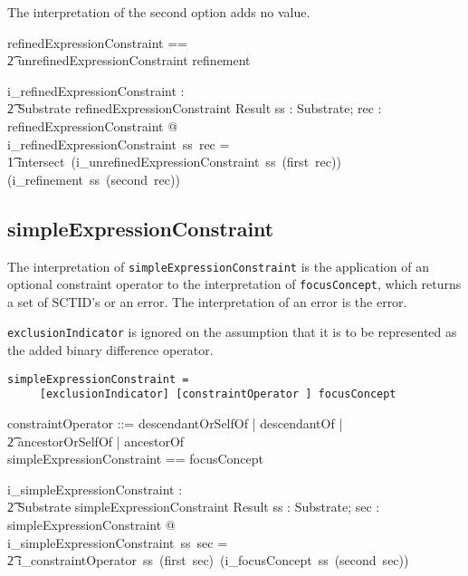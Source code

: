 \documentclass{article}
\def\spec#1{{\tt #1}}
\begin{document}
The interpretation of the second option adds no value.
\begin{zed}
refinedExpressionConstraint == \\
\t2 unrefinedExpressionConstraint \cross refinement
\end{zed}

\begin{gendef}
   i\_refinedExpressionConstraint : \\
\t2 Substrate \pfun refinedExpressionConstraint \pfun Result
\where
   \forall ss : Substrate; rec : refinedExpressionConstraint @ \\
   i\_refinedExpressionConstraint~ss~rec = \\
\t1 intersect~(i\_unrefinedExpressionConstraint~ss~(first~rec)) (i\_refinement~ss~(second~rec))
\end{gendef}


\subsection{simpleExpressionConstraint}
The interpretation of  \spec{simpleExpressionConstraint} is the application of an optional constraint 
operator to the interpretation of \spec{focusConcept}, which returns a set of SCTID's or an error.
The interpretation of an error is the error.

\spec{exclusionIndicator} is ignored on the assumption that it is to be represented as the added
binary difference operator.

\begin{verbatim}
simpleExpressionConstraint =  
     [exclusionIndicator] [constraintOperator ] focusConcept
\end{verbatim}


\begin{zed}
constraintOperator ::= descendantOrSelfOf | descendantOf |  \\
\t2 ancestorOrSelfOf | ancestorOf \\
simpleExpressionConstraint == \optional[constraintOperator] \cross focusConcept 
\end{zed} 

\begin{gendef}
   i\_simpleExpressionConstraint : \\
\t2 Substrate \pfun simpleExpressionConstraint \pfun Result
\where
   \forall ss : Substrate; sec : simpleExpressionConstraint @ \\
i\_simpleExpressionConstraint~ss~sec =  \\
\t2 i\_constraintOperator~ss~(first~sec)~(i\_focusConcept~ss~(second~sec))
\end{gendef}
\end{document}
